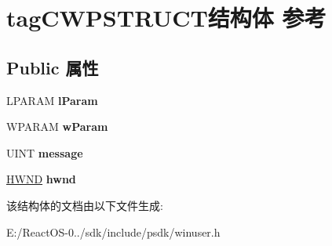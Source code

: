 \hypertarget{structtag_c_w_p_s_t_r_u_c_t}{}\section{tag\+C\+W\+P\+S\+T\+R\+U\+C\+T结构体 参考}
\label{structtag_c_w_p_s_t_r_u_c_t}
\subsection*{Public 属性}
\begin{DoxyCompactItemize}
\item 
\mbox{\label{structtag_c_w_p_s_t_r_u_c_t_aa6c3f21b4c83c30ddb455e37e9d4b8bf}} 
L\+P\+A\+R\+AM {\bfseries l\+Param}
\item 
\mbox{\label{structtag_c_w_p_s_t_r_u_c_t_aa9162b8d1f1e069ed6c4afd117232130}} 
W\+P\+A\+R\+AM {\bfseries w\+Param}
\item 
\mbox{\label{structtag_c_w_p_s_t_r_u_c_t_ab6106cf4c3acaf9f652c95dc2b78cf84}} 
U\+I\+NT {\bfseries message}
\item 
\mbox{\label{structtag_c_w_p_s_t_r_u_c_t_a2ec3495bbe512b0ea76d1fbea09f6ea2}} 
\hyperlink{interfacevoid}{H\+W\+ND} {\bfseries hwnd}
\end{DoxyCompactItemize}


该结构体的文档由以下文件生成\+:\begin{DoxyCompactItemize}
\item 
E\+:/\+React\+O\+S-\/0../sdk/include/psdk/winuser.\+h\end{DoxyCompactItemize}
